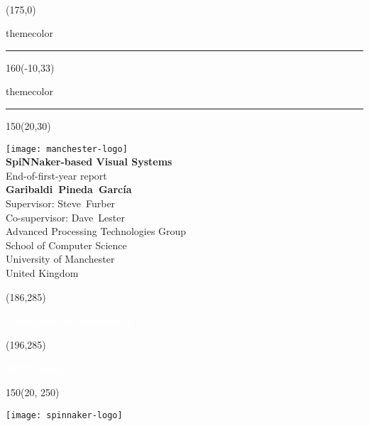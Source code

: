 \setlength{\TPHorizModule}{1mm}
\setlength{\TPVertModule}{1mm}
\begin{titlepage}
  ~
  \begin{textblock}{50}(175,0)
    \begin{color}{themecolor}
      \rule{3cm}{30cm}
    \end{color}
  \end{textblock}

  \begin{textblock}{160}(-10,33)
    \begin{color}{themecolor}
      \rule{160cm}{2.2cm}
    \end{color}
  \end{textblock}
  
  \begin{textblock}{150}(20,30)
    \begin{flushright}
    \texttt{[image: manchester-logo]}\\[5em]
    
    {\noindent\Huge\bfseries SpiNNaker-based Visual Systems}\\[2em]
    
    {\noindent\huge End-of-first-year report }\\[5em]
    
    {\noindent\Large\bfseries Garibaldi~Pineda~García}\\[0.5em]
    {\noindent\Large Supervisor: Steve~Furber}\\[0.1em]
    {\noindent\Large Co-supervisor: Dave~Lester}\\[1em]
    {\noindent\large Advanced Processing Technologies Group\\
      School of Computer Science \\
      University of Manchester\\[0.4em]
      United Kingdom}
    \end{flushright}
  \end{textblock}
  
  
  \begin{textblock}{20}(186,285)
    \begin{rotate}{90}
      {\huge\bfseries \textcolor{white}{University of Manchester}}
    \end{rotate}
  \end{textblock}
  \begin{textblock}{20}(196,285)
    \begin{rotate}{90}
      {\huge\bfseries \textcolor{white}{APT Group}}
    \end{rotate}
  \end{textblock}  

  \begin{textblock}{150}(20, 250)
    \begin{flushright}
    \texttt{[image: spinnaker-logo]}
    \end{flushright}
  \end{textblock}
  
\end{titlepage}